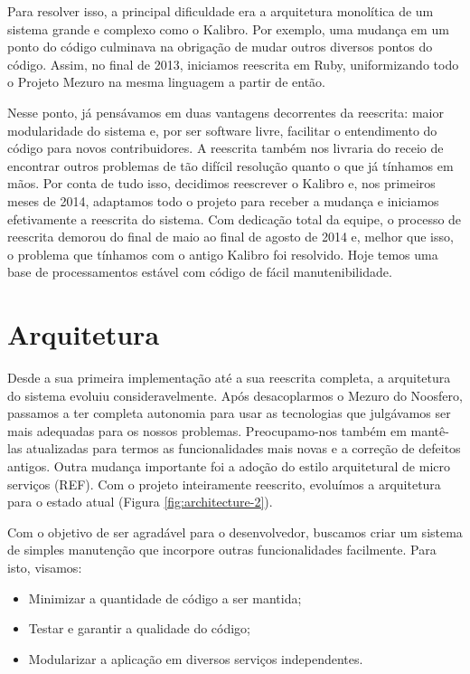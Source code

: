 \documentclass{llncs}
\begin{document}
Para resolver isso, a principal dificuldade era a arquitetura monolítica de um sistema grande e complexo como o Kalibro. Por exemplo, uma mudança em um ponto do código culminava na obrigação de mudar outros diversos pontos do código. Assim, no final de 2013, iniciamos reescrita em Ruby, uniformizando todo o Projeto Mezuro na mesma linguagem a partir de então.

Nesse ponto, já pensávamos em duas vantagens decorrentes da reescrita: maior
modularidade do sistema e, por ser software livre, facilitar o entendimento do
código para novos contribuidores. A reescrita também nos livraria do receio de
encontrar outros problemas de tão difícil resolução quanto o que já tínhamos em
mãos. Por conta de tudo isso, decidimos reescrever o Kalibro e, nos primeiros
meses de 2014, adaptamos todo o projeto para receber a mudança e iniciamos
efetivamente a reescrita do sistema. Com dedicação total da equipe, o processo
de reescrita demorou do final de maio ao final de agosto de 2014 e, melhor que
isso, o problema que tínhamos com o antigo Kalibro foi resolvido. Hoje temos
uma base de processamentos estável com código de fácil manutenibilidade.

\section{Arquitetura}

Desde a sua primeira implementação até a sua reescrita completa, a arquitetura
do sistema evoluiu consideravelmente. Após desacoplarmos o Mezuro do Noosfero,
passamos a ter completa autonomia para usar as tecnologias que julgávamos ser
mais adequadas para os nossos problemas. Preocupamo-nos também em mantê-las
atualizadas para termos as funcionalidades mais novas e a correção de defeitos
antigos. Outra mudança importante foi a adoção do estilo arquitetural de micro
serviços (REF). Com o projeto inteiramente reescrito, evoluímos a arquitetura
para o estado atual (Figura \ref{fig:architecture-2}).

Com o objetivo de ser agradável para o desenvolvedor, buscamos criar um sistema
de simples manutenção que incorpore outras funcionalidades facilmente. Para
isto, visamos:

\begin{itemize}
  \item Minimizar a quantidade de código a ser mantida;
  \item Testar e garantir a qualidade do código;
  \item Modularizar a aplicação em diversos serviços independentes.
\end{itemize}
\end{document}
